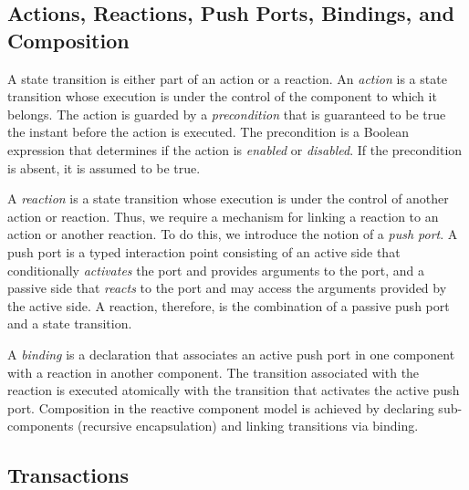 \subsection{Actions, Reactions, Push Ports, Bindings, and Composition}
\label{composition}
A state transition is either part of an action or a reaction.
An \emph{action} is a state transition whose execution is under the control of the component to which it belongs.
The action is guarded by a \emph{precondition} that is guaranteed to be true the instant before the action is executed.
The precondition is a Boolean expression that determines if the action is \emph{enabled} or \emph{disabled}.
If the precondition is absent, it is assumed to be true.

A \emph{reaction} is a state transition whose execution is under the control of another action or reaction.
Thus, we require a mechanism for linking a reaction to an action or another reaction.
To do this, we introduce the notion of a \emph{push port}.
A push port is a typed interaction point consisting of an active side that conditionally \emph{activates} the port and provides arguments to the port, and a passive side that \emph{reacts} to the port and may access the arguments provided by the active side.
A reaction, therefore, is the combination of a passive push port and a state transition.

A \emph{binding} is a declaration that associates an active push port in one component with a reaction in another component.
The transition associated with the reaction is executed atomically with the transition that activates the active push port.
Composition in the reactive component model is achieved by declaring sub-components (recursive encapsulation) and linking transitions via binding.

\subsection{Transactions}

